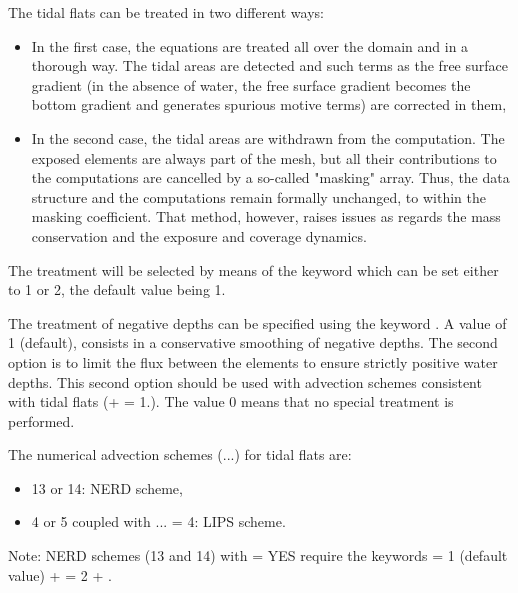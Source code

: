 The tidal flats can be treated in two different ways:

\begin{itemize}
\item In the first case, the equations are treated all over the domain and in
a thorough way. The tidal areas are detected and such terms as the free surface
gradient (in the absence of water, the free surface gradient becomes the bottom
gradient and generates spurious motive terms) are corrected in them,

\item In the second case, the tidal areas are withdrawn from the computation.
The exposed elements are always part of the mesh, but all their contributions
to the computations are cancelled by a so-called "masking" array. Thus, the
data structure and the computations remain formally unchanged, to within the
masking coefficient. That method, however, raises issues as regards the mass
conservation and the exposure and coverage dynamics.
\end{itemize}

The treatment will be selected by means of the keyword  which can be set either to 1 or 2, the default value
being 1.

The treatment of negative depths can be specified using the keyword
. A value of 1 (default), consists in a
conservative smoothing of negative depths. The second option is to limit the
flux between the elements to ensure strictly positive water depths. This second
option should be used with advection schemes consistent with tidal flats (+
 = 1.). The value 0 means that no special
treatment is performed.

The numerical advection schemes (...) for tidal
flats are:
\begin{itemize}
\item 13 or 14: NERD scheme,
\item 4 or 5 coupled with ... = 4:
LIPS scheme.
\end{itemize}

\begin{WarningBlock}{Note:}
NERD schemes (13 and 14) with  = YES
require the keywords
   = 1 (default value)
+  = 2
+ .
\end{WarningBlock}

